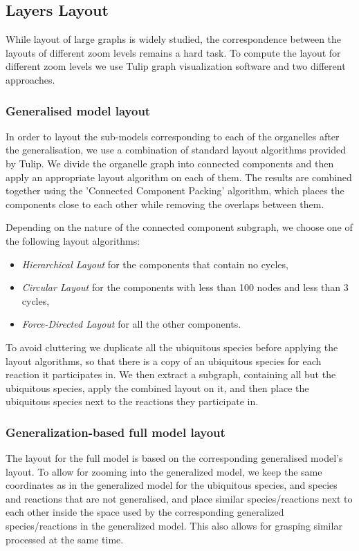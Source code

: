 \documentclass{bmcart}
\begin{document}

\subsection*{Layers Layout}
While layout of large graphs is widely studied\cite{Unwin2006}, the correspondence between the layouts of different zoom levels remains a hard task. To compute the layout for different zoom levels we use Tulip graph visualization software\cite{Auber04} and two different approaches.
\subsubsection*{Generalised model layout}
In order to layout the sub-models corresponding to each of the organelles after the generalisation, we use a combination of standard layout algorithms provided by Tulip. We divide the organelle graph into connected components and then apply an appropriate layout algorithm on each of them. The results are combined together using the 'Connected Component Packing' algorithm, which places the components close to each other while removing the overlaps between them.

Depending on the nature of the connected component subgraph, we choose one of the following layout algorithms:
\begin{itemize}
\item \emph{Hierarchical Layout} for the components that contain no cycles,
\item \emph{Circular Layout} for the components with less than 100 nodes and less than 3 cycles,
\item \emph{Force-Directed Layout} for all the other components.
\end{itemize}

To avoid cluttering we duplicate all the ubiquitous species before applying the layout algorithms, so that there is a copy of an ubiquitous species for each reaction it participates in. We then extract a subgraph, containing all but the ubiquitous species, apply the combined layout on it, and then place the ubiquitous species next to the reactions they participate in.

\subsubsection*{Generalization-based full model layout}
The layout for the full model is based on the corresponding generalised model's layout. To allow for zooming into the generalized model, we keep the same coordinates as in the generalized model for the ubiquitous species, and species and reactions that are not generalised, and place similar species/reactions next to each other inside the space used by the corresponding generalized species/reactions in the generalized model. This also allows for grasping similar processed at the same time. 
 
\end{document}
